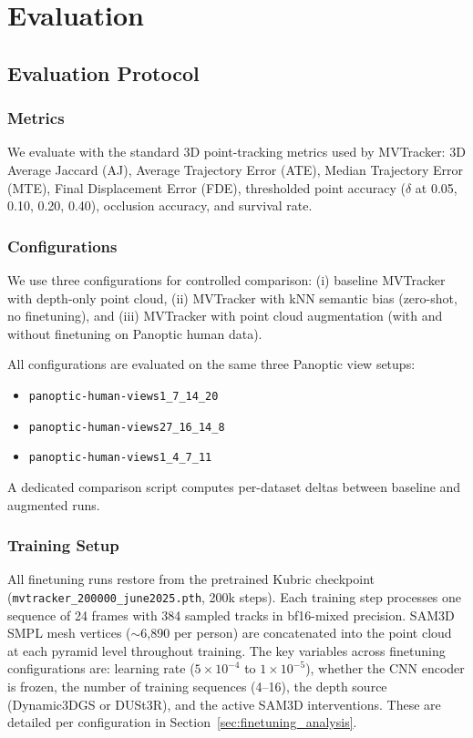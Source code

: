 \documentclass[12pt, a4paper, oneside]{report}
\begin{document}
\chapter{Evaluation}
\label{ch:eval}
\section{Evaluation Protocol}
\subsection{Metrics}
We evaluate with the standard 3D point-tracking metrics used by MVTracker: 3D Average Jaccard (AJ), Average Trajectory Error (ATE), Median Trajectory Error (MTE), Final Displacement Error (FDE), thresholded point accuracy ($\delta$ at 0.05, 0.10, 0.20, 0.40), occlusion accuracy, and survival rate.

\subsection{Configurations}
We use three configurations for controlled comparison: (i) baseline MVTracker with depth-only point cloud, (ii) MVTracker with kNN semantic bias (zero-shot, no finetuning), and (iii) MVTracker with point cloud augmentation (with and without finetuning on Panoptic human data).

All configurations are evaluated on the same three Panoptic view setups:
\begin{itemize}
    \item \texttt{panoptic-human-views1\_7\_14\_20}
    \item \texttt{panoptic-human-views27\_16\_14\_8}
    \item \texttt{panoptic-human-views1\_4\_7\_11}
\end{itemize}
A dedicated comparison script computes per-dataset deltas between baseline and augmented runs.

\subsection{Training Setup}
All finetuning runs restore from the pretrained Kubric checkpoint (\texttt{mvtracker\_200000\_june2025.pth}, 200k steps). Each training step processes one sequence of 24 frames with 384 sampled tracks in bf16-mixed precision. SAM3D SMPL mesh vertices ($\sim$6{,}890 per person) are concatenated into the point cloud at each pyramid level throughout training. The key variables across finetuning configurations are: learning rate ($5 \times 10^{-4}$ to $1 \times 10^{-5}$), whether the CNN encoder is frozen, the number of training sequences (4--16), the depth source (Dynamic3DGS or DUSt3R), and the active SAM3D interventions. These are detailed per configuration in Section~\ref{sec:finetuning_analysis}.
\end{document}
